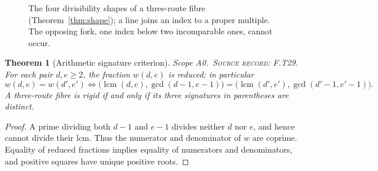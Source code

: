 \documentclass[11pt,oneside,openany]{book}
\newtheorem{theorem}{Theorem}[chapter]
\theoremstyle{definition}
\theoremstyle{remark}
\newcommand{\lcmop}{\operatorname{lcm}}
\newcommand{\gcdop}{\operatorname{gcd}}
\newcommand{\scope}[1]{\textsf{\small Scope #1.}\ }
\newcommand{\record}[1]{\textup{\textsc{Source record: #1.}}\ }
\begin{document}
\begin{figure}[t]
\centering
{}
\caption{The four divisibility shapes of a three-route fibre (Theorem~\ref{thm:shape}); a line joins an index to a proper multiple. The opposing fork, one index below two incomparable ones, cannot occur.}\label{fig:shapes}
\end{figure}

\begin{theorem}[Arithmetic signature criterion]\label{thm:signature}
\scope{A0}\record{F.T29} For each pair \(d,e\ge2\), the fraction \(w(d,e)\) is reduced; in particular
\[
 w(d,e)=w(d',e')\iff
 \big(\lcmop(d,e),\gcdop(d-1,e-1)\big)
 =\big(\lcmop(d',e'),\gcdop(d'-1,e'-1)\big).
\]
A three-route fibre is rigid if and only if its three signatures in parentheses are distinct.
\end{theorem}
\begin{proof}
A prime dividing both \(d-1\) and \(e-1\) divides neither \(d\) nor \(e\), and hence cannot divide their lcm. Thus the numerator and denominator of \(w\) are coprime. Equality of reduced fractions implies equality of numerators and denominators, and positive squares have unique positive roots.
\end{proof}
\end{document}
